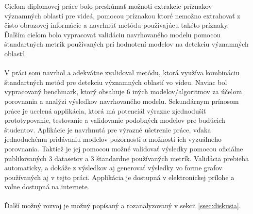 Cieľom diplomovej práce bolo preskúmať možnoti extrakcie príznakov významných oblastí pre videá, pomocou príznakou ktoré nemožno extrahovať z čisto obrazovej informácie a navrhnúť metódu používajúcu takéto príznaky.
Ďaľším cieľom bolo vypracovať validáciu navrhovaného modelu pomocou štandartných metrík používaných pri hodnotení modelov na detekciu významných oblastí.
\\
\\
V práci som navrhol a adekvátne zvalidoval metódu, ktorá využíva kombináciu štandartných metód pre detekciu významných oblastí vo videu.
Naviac bol vypracovaný benchmark, ktorý obsahuje 6 iných modelov/algoritmov za účelom porovnania a analýzi výsledkov navrhovaného modelu.
Sekundárnym prínosom práce je ucelená applikácia, ktorá má potenciál výrazne zjednodušiť prototypovanie, testovanie a validovanie podobných modelov pre budúcich študentov.
Aplikácie je navrhnutá pre výrazné ušetrenie práce, vďaka jednoduchému pridávaniu modelov pozornosti a možnosti ich vyzuálneho porovnania.
Taktiež je jej pomocou možné validovať výsledky pomocou oficiálne publikovaných 3 datasetov a 3 štandardne používaných metrík.
Validácia prebieha automaticky, a dokáže z výsledkov aj generovať výsledky vo forme grafov používaných aj v tejto práci.
Applikácia je dostupná v elektronickej prílohe a voľne dostupná na internete.
\\
\\
Ďalší možný rozvoj je možný popísaný a rozanalyzovaný v sekcii \ref{ssec:diskusia}.
